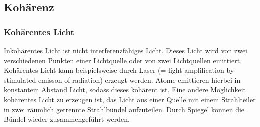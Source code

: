 
\subsection{Kohärenz}
\subsubsection{Kohärentes Licht}
Inkohärentes Licht ist nicht interferenzfähiges Licht. Dieses Licht wird von zwei
verschiedenen Punkten einer Lichtquelle oder von zwei Lichtquellen emittiert.
\newline
Kohärentes Licht kann beispielsweise durch Laser (= light amplification by stimulated emisson of radiation)
erzeugt werden. Atome emittieren hierbei in konstantem Abstand Licht, sodass dieses 
kohärent ist.
\newline
Eine andere Möglichkeit kohärentes Licht zu erzeugen ist, das Licht aus einer Quelle
mit einem Strahlteiler in zwei räumlich getrennte Strahlbündel aufzuteilen.
Durch Spiegel können die Bündel wieder zusammengeführt werden.

